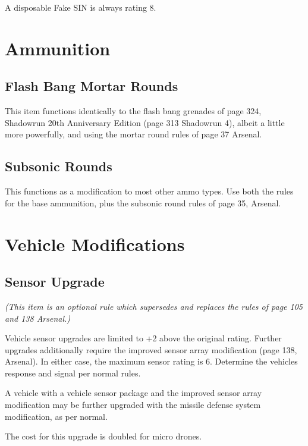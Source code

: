 \documentclass{article}
\begin{document}
A disposable Fake SIN is always rating 8.

\section*{Ammunition}

\subsection*{Flash Bang Mortar Rounds}

 This item functions identically to the flash bang grenades of page 324, Shadowrun 20th Anniversary Edition (page 313 Shadowrun 4), albeit a little more powerfully, and using the mortar round rules of page 37 Arsenal. 

\subsection*{Subsonic Rounds}

  This functions as a modification to most other ammo types.  Use both the rules for the base ammunition, plus the subsonic round rules of page 35, Arsenal.

\section*{Vehicle Modifications}

\subsection*{Sensor Upgrade}

\emph{(This item is an optional rule which supersedes and replaces the rules of page 105 and 138 Arsenal.)}

 Vehicle sensor upgrades are limited to +2 above the original rating. Further upgrades additionally require the improved sensor array modification (page 138, Arsenal).  In either case, the maximum sensor rating is 6. Determine the vehicles response and signal per normal rules.

 A vehicle with a vehicle sensor package and the improved sensor array modification may be further upgraded with the missile defense system modification, as per normal.

 The cost for this upgrade is doubled for micro drones.

\onecolumn
\end{document}
